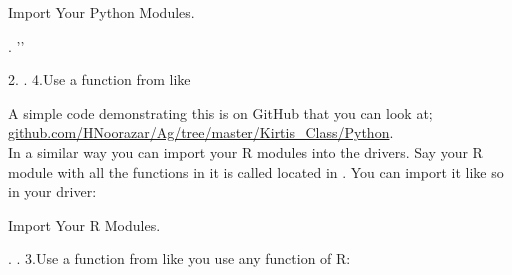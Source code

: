 \begin{tcolorbox}
  \begin{algorithm}[H]
  \label{alg:importPythonCode}
   \caption{Import Your Python Modules.}
. ''\code{)}

2.     .     \;
4.Use a function from  like \\
\end{algorithm}
\end{tcolorbox}
A simple code demonstrating this is on GitHub that you can look at;
\href{https://github.com/HNoorazar/Ag/tree/master/Kirtis\_Class/Python}{github.com/HNoorazar/Ag/tree/master/Kirtis\_Class/Python}.\\

In a similar way you can import your R modules into the drivers.
Say your R module with all the functions in it is called 
located in .
You can import it like so in your driver:

\begin{tcolorbox}
  \begin{algorithm}[H]
  \label{alg:importRCode}
   \caption{Import Your R Modules.}
.   .  \;
3.Use a function from  like you use any function of R: \\
\end{algorithm}
\end{tcolorbox}








